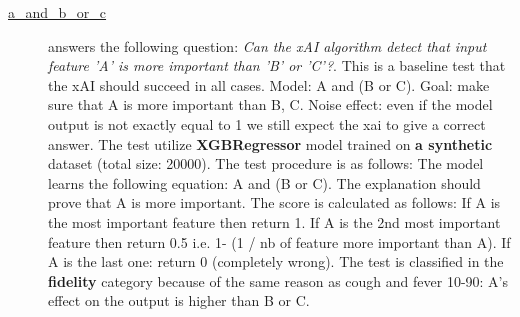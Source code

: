 \begin{description}
\item[\href{Compare-xAI/tree/main/tests/a_and_b_or_c.py}{a\_and\_b\_or\_c}] answers the following question: \emph{Can the xAI algorithm detect that input feature 'A' is more important than 'B' or 'C'?}.
This is a baseline test that the xAI should succeed in all cases. Model: A and (B or C). Goal: make sure that A is more important than B, C. Noise effect: even if the model output is not exactly equal to 1 we still expect the xai to give a correct answer.
 The test utilize \textbf{XGBRegressor} model trained on \textbf{a synthetic} dataset (total size: 20000).
 The test procedure is as follows: The model learns the following equation: A and (B or C). The explanation should prove that A is more important.
 The score is calculated as follows: If A is the most important feature then return 1. If A is the 2nd most important feature then return 0.5 i.e. 1- (1 / nb of feature more important than A).  If A is the last one: return 0 (completely wrong).
 The test is classified in the \textbf{fidelity} category because of the same reason as cough and fever 10-90: A's effect on the output is higher than B or C.

\end{description}
